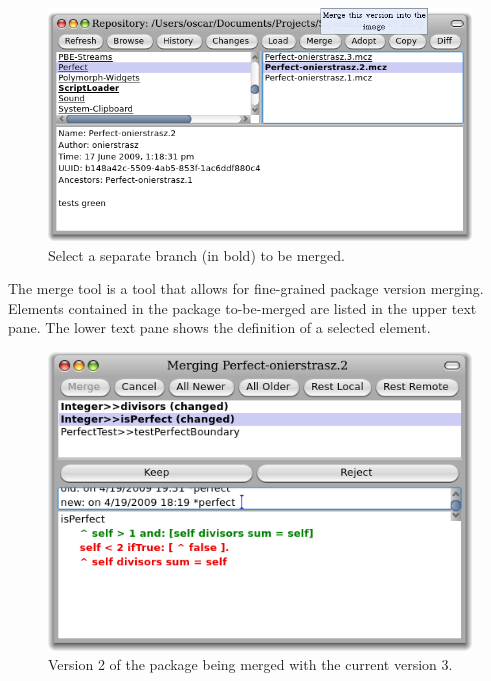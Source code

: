 \documentclass[a4paper,10pt,twoside]{book}
\begin{document}
\begin{figure}[ht]\centering
	\includegraphics[width=\textwidth]{mergeButton}
	\caption{Select a separate branch (in bold) to be merged.}
\end{figure}


The merge tool is a tool that allows for fine-grained package version merging. Elements contained in the package to-be-merged are listed in the upper text pane. The lower text pane shows the definition of a selected element. 

\begin{figure}[ht]\centering
	\includegraphics[width=.8\textwidth]{mergeTool}
	\caption{Version 2 of the  package being merged with the current version 3.
	}
\end{figure}
\end{document}
